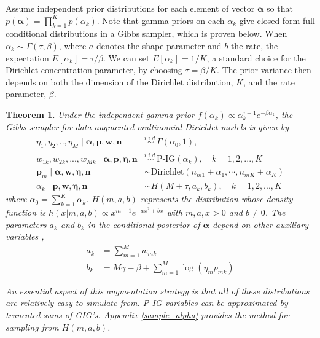 \documentclass{statsoc}
\newcommand{\p}{\bm{p}}
\newcommand{\w}{\bm{w}}
\newcommand{\eeta}{\bm{\eta}}
\newcommand{\alphavec}{\bm{\alpha}}
\newcommand{\nn}{\bm{n}}
\newtheorem{theorem}{Theorem}
\begin{document}
Assume independent prior distributions for each element of vector $\alphavec$ so that $p\left(\alphavec\right) = \prod_{k=1}^K p(\alpha_k)$. Note that gamma priors on each $\alpha_k$ give closed-form full conditional distributions in a Gibbs sampler, which is proven below. When $\alpha_k \sim \Gamma(\tau, \beta)$, where $a$ denotes the shape parameter and $b$ the rate, the expectation $E[\alpha_k] =\tau/\beta$.  We can set $E[\alpha_k] = 1/K$, a standard choice for the Dirichlet concentration parameter, by choosing $\tau = \beta/K$.  The prior variance then depends on both the dimension of the Dirichlet distribution, $K$, and the rate parameter, $\beta$. 
\begin{theorem}
\label{thm:theorem_2}
Under the independent gamma prior $f(\alpha_k) \propto \alpha_k^{\tau-1} e^{-\beta \alpha_k}$, the Gibbs sampler for data augmented multinomial-Dirichlet models is given by
\begin{equation}
\begin{aligned}
\eta_1, \eta_2, .., \eta_M \mid \alphavec, \p, \w, \nn &\overset{i.i.d.}{\sim} \Gamma(\alpha_0, 1),\\
w_{1k}, w_{2k}, ..., w_{Mk} \mid \alphavec, \p, \eeta, \nn &\overset{i.i.d.}{\sim} \text{P-IG}(\alpha_k), \quad k=1,2,..., K\\
\p_m \mid \alphavec, \w, \eeta,\nn &\sim \text{Dirichlet}\left(n_{m1} + \alpha_1, \cdots, n_{mK} + \alpha_K\right)\\
\alpha_k \mid \p, \w, \eeta,\nn &\sim H(M+\tau, a_k, b_k),\quad k=1,2,..., K
\end{aligned}
\end{equation}
where $\alpha_0 = \sum_{k=1}^K \alpha_k$. $H(m, a,b)$ represents the distribution whose density function is $h(x|m,a,b) \propto x^{m-1}e^{-ax^2+bx}$ with $m, a, x > 0$ and $b\neq 0$. The parameters $a_k$ and $b_k$ in the conditional posterior of $\alphavec$ depend on other auxiliary variables ,
\begin{align*}
a_k &= \sum_{m=1}^Mw_{mk}\\
b_k &= M\gamma - \beta + \sum_{m=1}^M \log(\eta_m p_{mk})
\end{align*}

An essential aspect of this augmentation strategy is that all of these distributions are relatively easy to simulate from. P-IG variables can be approximated by truncated sums of GIG's.  Appendix \ref{sample_alpha} provides the method for sampling from $H(m,a,b)$.
\end{theorem}
\end{document}
